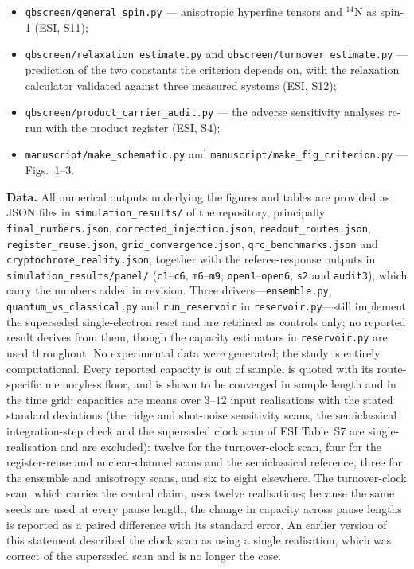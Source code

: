 \documentclass[11pt,a4paper]{article}
\begin{document}
\begin{itemize}
heterogeneous couplings, desynchronised turnover, and heterogeneous relaxation
times with the mean-field control that separates the spread from the shift in
mean survival (ESI, S10);
\item \texttt{qbscreen/general\_spin.py} --- anisotropic hyperfine tensors and
$^{14}$N as spin-1 (ESI, S11);
\item \texttt{qbscreen/relaxation\_estimate.py} and
\texttt{qbscreen/turnover\_estimate.py} --- prediction of the two constants the
criterion depends on, with the relaxation calculator validated against three
measured systems (ESI, S12);
\item \texttt{qbscreen/product\_carrier\_audit.py} --- the adverse sensitivity
analyses re-run with the product register (ESI, S4);
\item \texttt{manuscript/make\_schematic.py} and
\texttt{manuscript/make\_fig\_criterion.py} --- Figs.~1--3.
\end{itemize}

\noindent\textbf{Data.}
All numerical outputs underlying the figures and tables are provided as JSON files in
\texttt{simulation\_results/} of the repository, principally
\texttt{final\_numbers.json}, \texttt{corrected\_injection.json},
\texttt{readout\_routes.json}, \texttt{register\_reuse.json},
\texttt{grid\_convergence.json}, \texttt{qrc\_benchmarks.json} and
\texttt{cryptochrome\_reality.json}, together with the referee-response outputs in
\texttt{simulation\_results/panel/} (\texttt{c1}--\texttt{c6}, \texttt{m6}--\texttt{m9},
\texttt{open1}--\texttt{open6}, \texttt{s2} and \texttt{audit3}), which carry the
numbers added in revision.
Three drivers---\texttt{ensemble.py}, \texttt{quantum\_vs\_classical.py} and
\texttt{run\_reservoir} in \texttt{reservoir.py}---still implement the superseded
single-electron reset and are retained as controls only; no reported result
derives from them, though the capacity estimators in \texttt{reservoir.py} are
used throughout. No experimental data were generated; the study
is entirely computational. Every reported capacity is out of sample, is quoted with
its route-specific memoryless floor, and is shown to be converged in sample length
and in the time grid; capacities are means over $3$--$12$ input realisations with the
stated standard deviations (the ridge and shot-noise sensitivity scans, the semiclassical
integration-step check and the superseded clock scan of ESI Table~S7 are
single-realisation and are excluded): twelve for the turnover-clock scan, four for the
register-reuse and nuclear-channel scans and the semiclassical reference, three
for the ensemble and anisotropy scans, and six to eight elsewhere. The turnover-clock scan, which carries the
central claim, uses twelve realisations; because the same seeds are used
at every pause length, the change in capacity across pause lengths is reported as
a paired difference with its standard error. An earlier version of this statement
described the clock scan as using a single realisation, which was correct of the
superseded scan and is no longer the case.
\end{document}
